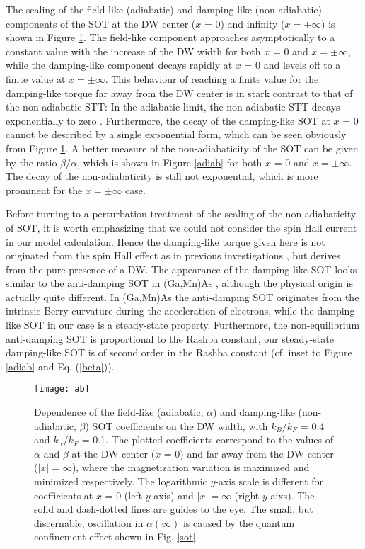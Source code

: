 \documentclass[12pt]{iopart}
\begin{document}
The scaling of the field-like (adiabatic) and damping-like (non-adiabatic) components of the SOT at the DW center ($x$ = 0) and infinity ($x = \pm \infty$) is shown in Figure \ref{ab}. The field-like component approaches asymptotically to a constant value with the increase of the DW width for both $x$ = 0 and $x= \pm \infty$, while the damping-like component decays rapidly at $x$ = 0 and levels off to a finite value at $x = \pm \infty$. This behaviour of reaching a finite value for the damping-like torque far away from the DW center is in stark contrast to that of the non-adiabatic STT: In the adiabatic limit, the non-adiabatic STT decays exponentially to zero \cite{Xiao06}. Furthermore, the decay of the damping-like SOT at $x$ = 0 cannot be described by a single exponential form, which can be seen obviously from Figure \ref{ab}. A better measure of the non-adiabaticity of the SOT can be given by the ratio $\beta/\alpha$, which is shown in Figure \ref{adiab} for both $x$ = 0 and $x = \pm \infty$. The decay of the non-adiabaticity is still not exponential, which is more prominent for the $x = \pm \infty$ case.

Before turning to a perturbation treatment of the scaling of the non-adiabaticity of SOT, it is worth emphasizing that we could not consider the spin Hall current in our model calculation. Hence the damping-like torque given here is not originated from the spin Hall effect as in previous investigations \cite{Wang12,Freimuth13,Wimmer16}, but derives from the pure presence of a DW. The appearance of the damping-like SOT looks similar to the anti-damping SOT in (Ga,Mn)As \cite{Kurebayashi14}, although the physical origin is actually quite different. In (Ga,Mn)As the anti-damping SOT originates from the intrinsic Berry curvature during the acceleration of electrons, while the damping-like SOT in our case is a steady-state property. Furthermore, the non-equilibrium anti-damping SOT is proportional to the Rashba constant, our steady-state damping-like SOT is of second order in the Rashba constant (cf. inset to Figure \ref{adiab} and Eq. (\ref{beta})).
\begin{figure}
\hspace {4 cm}
\begin{minipage}[c]{0.5\linewidth}\centering
\texttt{[image: ab]}
\end{minipage}
\caption{Dependence of the field-like (adiabatic, $\alpha$) and damping-like (non-adiabatic, $\beta$) SOT coefficients on the DW width, with $k_B/k_F$ = 0.4 and $k_\alpha/k_F$ = 0.1. The plotted coefficients correspond to the values of $\alpha$ and $\beta$ at the DW center ($x$ = 0) and far away from the DW center ($|x| = \infty$), where the magnetization variation is maximized and minimized respectively. The logarithmic $y$-axis scale is different for coefficients at $x$ = 0 (left $y$-axis) and $|x| = \infty$ (right $y$-aixs). The solid and dash-dotted lines are guides to the eye. The small, but discernable, oscillation in $\alpha (\infty)$ is caused by the quantum confinement effect shown in Fig. \ref{sot}}
\label{ab}
\end{figure}
\end{document}

